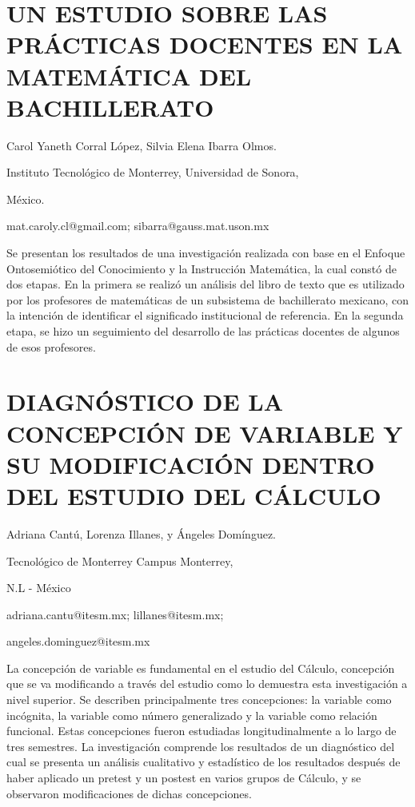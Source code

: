 \section{UN ESTUDIO SOBRE LAS PRÁCTICAS DOCENTES EN LA MATEMÁTICA DEL BACHILLERATO }

\begin{datos}

Carol Yaneth Corral López, Silvia Elena Ibarra Olmos.

Instituto Tecnológico de Monterrey, Universidad de Sonora,

México. 

mat.caroly.cl@gmail.com; sibarra@gauss.mat.uson.mx

\end{datos}

Se presentan los resultados de una investigación realizada con base
en el Enfoque Ontosemiótico del Conocimiento y la Instrucción Matemática,
la cual constó de dos etapas. En la primera se realizó un análisis
del libro de texto que es utilizado por los profesores de matemáticas
de un subsistema de bachillerato mexicano, con la intención de identificar
el significado institucional de referencia. En la segunda etapa, se
hizo un seguimiento del desarrollo de las prácticas docentes de algunos
de esos profesores. 


\section{\uppercase{ Diagnóstico de la Concepción de Variable y su modificación
dentro del estudio del cálculo }}

\begin{datos}

Adriana Cantú, Lorenza Illanes, y Ángeles Domínguez.

Tecnológico de Monterrey Campus Monterrey,

N.L - México 

adriana.cantu@itesm.mx; lillanes@itesm.mx;

angeles.dominguez@itesm.mx

\end{datos}

La concepción de variable es fundamental en el estudio del Cálculo,
concepción que se va modificando a través del estudio como lo demuestra
esta investigación a nivel superior. Se describen principalmente tres
concepciones: la variable como incógnita, la variable como número
generalizado y la variable como relación funcional. Estas concepciones
fueron estudiadas longitudinalmente a lo largo de tres semestres.
La investigación comprende los resultados de un diagnóstico del cual
se presenta un análisis cualitativo y estadístico de los resultados
después de haber aplicado un pretest y un postest en varios grupos
de Cálculo, y se observaron modificaciones de dichas concepciones.


